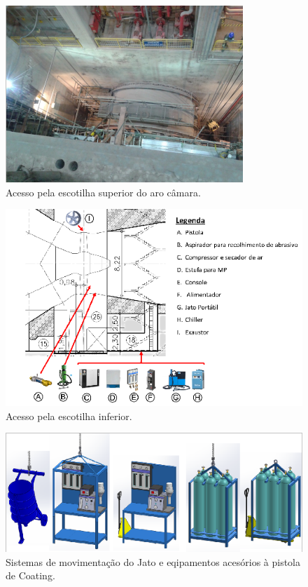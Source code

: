 \begin{figure}
	\centering
	\includegraphics[width=1\columnwidth]{sota/figs/projeto/proj_hvof_2.png}
    \caption{Acesso pela escotilha superior do aro câmara.}
    \label{fig:proj_hvof_2}
\end{figure}

\begin{figure}
	\centering
	\includegraphics[width=1\columnwidth]{sota/figs/projeto/proj_hvof_3.png}
    \caption{Acesso pela escotilha inferior.}
    \label{fig:proj_hvof_3}
\end{figure}

\begin{figure}
	\centering
	\includegraphics[width=1\columnwidth]{sota/figs/projeto/proj_hvof_4.png}
    \caption{Sistemas de movimentação do Jato e eqipamentos acesórios à pistola de Coating.}
    \label{fig:proj_hvof_4}
\end{figure}

